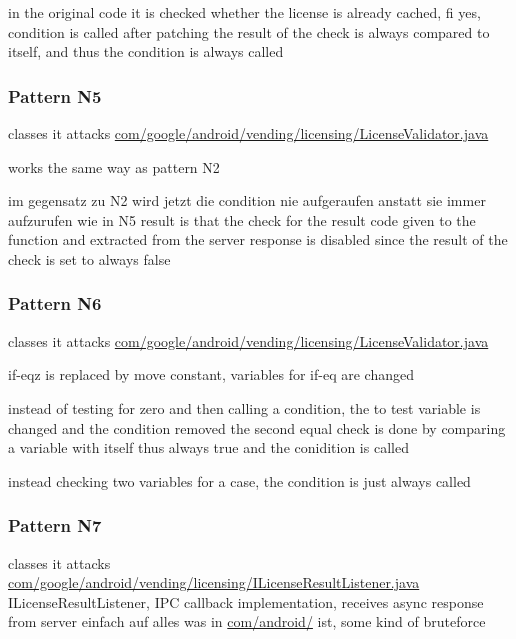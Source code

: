 in the original code it is checked whether the license is already cached, fi yes, condition is called
after patching the result of the check is always compared to itself, and thus  the condition is always called
\subsubsection{Pattern N5}
classes it attacks
\url{com/google/android/vending/licensing/LicenseValidator.java}

works the same way as pattern N2

im gegensatz zu N2 wird jetzt die condition nie aufgeraufen anstatt sie immer aufzurufen wie in N5
result is that the check for the result code given to the function and extracted from the server response is disabled since the result of the check is set to always false
\subsubsection{Pattern N6}
classes it attacks
\url{com/google/android/vending/licensing/LicenseValidator.java}



if-eqz is replaced by move constant, variables for if-eq are changed



instead of testing for zero and then calling a condition, the to test variable is changed and the condition removed
the second equal check is done by comparing a variable with itself thus always true and the conidition is called



instead checking two variables for a case, the condition is just always called
\subsubsection{Pattern N7}
classes it attacks
\url{com/google/android/vending/licensing/ILicenseResultListener.java}
ILicenseResultListener, IPC callback implementation, receives async response from server\cite{developersLicensingReference}
einfach auf alles was in \url{com/android/} ist, some kind of bruteforce


